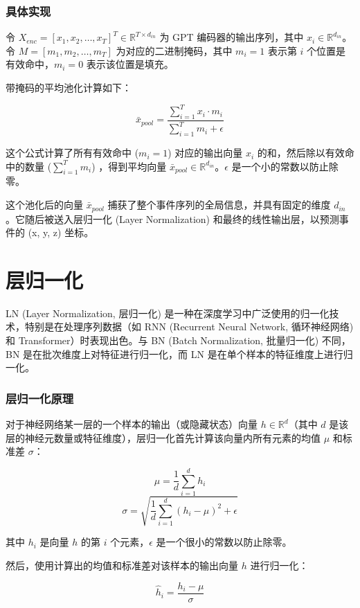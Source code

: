 \subsection{具体实现}

令 $X_{enc} = [x_1, x_2, \dots, x_T]^T \in \mathbb{R}^{T \times d_{in}}$ 为 GPT 编码器的输出序列，其中 $x_i \in \mathbb{R}^{d_{in}}$。
令 $M = [m_1, m_2, \dots, m_T]$ 为对应的二进制掩码，其中 $m_i=1$ 表示第 $i$ 个位置是有效命中，$m_i=0$ 表示该位置是填充。

带掩码的平均池化计算如下：

\[ \bar{x}_{pool} = \frac{\sum_{i=1}^{T} x_i \cdot m_i}{\sum_{i=1}^{T} m_i + \epsilon} \]

这个公式计算了所有有效命中 ($m_i=1$) 对应的输出向量 $x_i$ 的和，然后除以有效命中的数量 ($\sum_{i=1}^{T} m_i$) ，得到平均向量 $\bar{x}_{pool} \in \mathbb{R}^{d_{in}}$。$\epsilon$ 是一个小的常数以防止除零。

这个池化后的向量 $\bar{x}_{pool}$ 捕获了整个事件序列的全局信息，并具有固定的维度 $d_{in}$。它随后被送入层归一化 (Layer Normalization) 和最终的线性输出层，以预测事件的 (x, y, z) 坐标。

\chapter{层归一化}

LN (Layer Normalization, 层归一化) 是一种在深度学习中广泛使用的归一化技术，特别是在处理序列数据（如 RNN (Recurrent Neural Network, 循环神经网络) 和 Transformer）时表现出色。与 BN (Batch Normalization, 批量归一化) 不同，BN 是在批次维度上对特征进行归一化，而 LN 是在单个样本的特征维度上进行归一化。

\subsection{层归一化原理}

对于神经网络某一层的一个样本的输出（或隐藏状态）向量 $h \in \mathbb{R}^{d}$（其中 $d$ 是该层的神经元数量或特征维度），层归一化首先计算该向量内所有元素的均值 $\mu$ 和标准差 $\sigma$：

\[ \mu = \frac{1}{d} \sum_{i=1}^{d} h_i \]
\[ \sigma = \sqrt{\frac{1}{d} \sum_{i=1}^{d} (h_i - \mu)^2 + \epsilon} \]

其中 $h_i$ 是向量 $h$ 的第 $i$ 个元素，$\epsilon$ 是一个很小的常数以防止除零。

然后，使用计算出的均值和标准差对该样本的输出向量 $h$ 进行归一化：

\[ \hat{h}_i = \frac{h_i - \mu}{\sigma} \]

